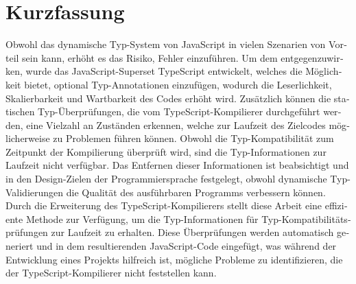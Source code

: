 \chapter{Kurzfassung}

\begin{german}
Obwohl das dynamische Typ-System von JavaScript in vielen Szenarien von Vorteil sein kann, erhöht es das Risiko, Fehler einzuführen. Um dem entgegenzuwirken, wurde das JavaScript-Superset TypeScript entwickelt, welches die Möglichkeit bietet, optional Typ-Annotationen einzufügen, wodurch die Leserlichkeit, Skalierbarkeit und Wartbarkeit des Codes erhöht wird. Zusätzlich können die statischen Typ-Überprüfungen, die vom TypeScript-Kompilierer durchgeführt werden, eine Vielzahl an Zuständen erkennen, welche zur Laufzeit des Zielcodes möglicherweise zu Problemen führen können. Obwohl die Typ-Kompatibilität zum Zeitpunkt der Kompilierung überprüft wird, sind die Typ-Informationen zur Laufzeit nicht verfügbar. Das Entfernen dieser Informationen ist beabsichtigt und in den Design-Zielen der Programmiersprache festgelegt, obwohl dynamische Typ-Validierungen die Qualität des ausführbaren Programms verbessern können. Durch die Erweiterung des TypeScript-Kompilierers stellt diese Arbeit eine effiziente Methode zur Verfügung, um die Typ-Informationen für Typ-Kompatibilitätsprüfungen zur Laufzeit zu erhalten. Diese Überprüfungen werden automatisch generiert und in dem resultierenden JavaScript-Code eingefügt, was während der Entwicklung eines Projekts hilfreich ist, mögliche Probleme zu identifizieren, die der TypeScript-Kompilierer nicht feststellen kann.
\end{german}
